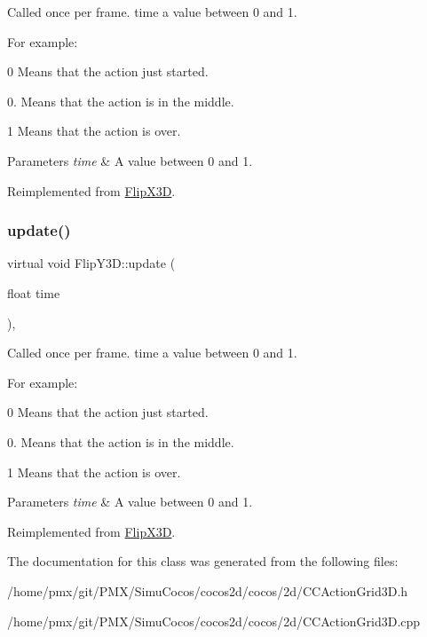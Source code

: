 Called once per frame. time a value between 0 and 1.

For example\+:
\begin{DoxyItemize}
\item 0 Means that the action just started.
\item 0. Means that the action is in the middle.
\item 1 Means that the action is over.
\end{DoxyItemize}


\begin{DoxyParams}{Parameters}
{\em time} & A value between 0 and 1. \\
\hline
\end{DoxyParams}


Reimplemented from \hyperlink{classFlipX3D_a6f3b43c2a5cf49ed00a373bf54cd97e9}{Flip\+X3D}.

\mbox{\label{classFlipY3D_a19706da07e07cdad9cf19509a2bb0bff}} 
\subsubsection{\texorpdfstring{update()}{update()}\hspace{0.1cm}{\footnotesize\ttfamily [2/2]}}
{\footnotesize\ttfamily virtual void Flip\+Y3\+D\+::update (\begin{DoxyParamCaption}\item[{float}]{time }\end{DoxyParamCaption})\hspace{0.3cm}{\ttfamily [override]}, {\ttfamily [virtual]}}

Called once per frame. time a value between 0 and 1.

For example\+:
\begin{DoxyItemize}
\item 0 Means that the action just started.
\item 0. Means that the action is in the middle.
\item 1 Means that the action is over.
\end{DoxyItemize}


\begin{DoxyParams}{Parameters}
{\em time} & A value between 0 and 1. \\
\hline
\end{DoxyParams}


Reimplemented from \hyperlink{classFlipX3D_a6f3b43c2a5cf49ed00a373bf54cd97e9}{Flip\+X3D}.



The documentation for this class was generated from the following files\+:\begin{DoxyCompactItemize}
\item 
/home/pmx/git/\+P\+M\+X/\+Simu\+Cocos/cocos2d/cocos/2d/C\+C\+Action\+Grid3\+D.\+h\item 
/home/pmx/git/\+P\+M\+X/\+Simu\+Cocos/cocos2d/cocos/2d/C\+C\+Action\+Grid3\+D.\+cpp\end{DoxyCompactItemize}
